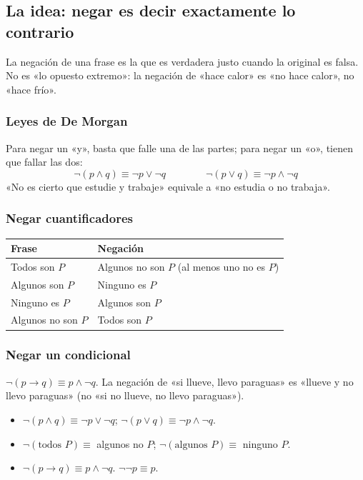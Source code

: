 \bitacora


\subsection{La idea: negar es decir exactamente lo contrario}
La negación de una frase es la que es verdadera justo cuando la original es falsa. No es «lo opuesto extremo»: la negación
de «hace calor» es «no hace calor», no «hace frío».

\subsubsection{Leyes de De Morgan}
Para negar un «y», basta que falle una de las partes; para negar un «o», tienen que fallar las dos:
\[\neg(p \wedge q) \equiv \neg p \vee \neg q \qquad\qquad \neg(p \vee q) \equiv \neg p \wedge \neg q\]
«No es cierto que estudie y trabaje» equivale a «no estudia o no trabaja».

\subsubsection{Negar cuantificadores}
\begin{center}\small
\begin{tabular}{@{}ll@{}}
\toprule
\textbf{Frase} & \textbf{Negación}\\\midrule
Todos son $P$ & Algunos no son $P$ (al menos uno no es $P$)\\
Algunos son $P$ & Ninguno es $P$\\
Ninguno es $P$ & Algunos son $P$\\
Algunos no son $P$ & Todos son $P$\\\bottomrule
\end{tabular}
\end{center}

\subsubsection{Negar un condicional}
$\neg(p \to q) \equiv p \wedge \neg q$. La negación de «si llueve, llevo paraguas» es «llueve y no llevo paraguas»
(no «si no llueve, no llevo paraguas»).

\begin{regla}
\begin{itemize}
  \item $\neg(p \wedge q) \equiv \neg p \vee \neg q$; $\neg(p \vee q) \equiv \neg p \wedge \neg q$.
  \item $\neg(\text{todos } P) \equiv$ algunos no $P$; $\neg(\text{algunos } P) \equiv$ ninguno $P$.
  \item $\neg(p \to q) \equiv p \wedge \neg q$. $\neg\neg p \equiv p$.
\end{itemize}
\end{regla}

